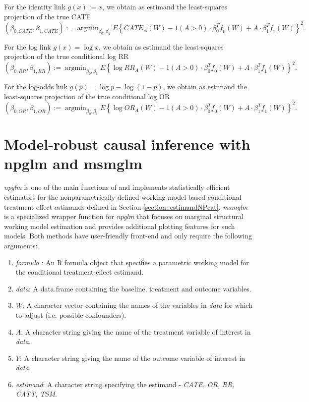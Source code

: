 \documentclass[
]{jss}
\DeclareMathOperator{\argmin}{argmin}
\begin{document}
For the identity link \(g(x) := x\), we obtain as estimand the
least-squares projection of the true CATE
\[ (\beta_{0,CATE}, \beta_{1,CATE}) := \argmin_{\beta_0, \beta_1} E \left\{ CATE_A(W)  - 1(A>0)\cdot \beta_0^T \underline{f}_0(W) +  A \cdot \beta_1^T \underline{f}_1(W)\right\}^2.\]

For the log link \(g(x) = \log x\), we obtain as estimand the
least-squares projection of the true conditional log RR
\[ (\beta_{0,RR}, \beta_{1,RR}) :=  \argmin_{\beta_0, \beta_1} E \left\{ \log RR_{A}(W)  - 1(A>0)\cdot \beta_0^T \underline{f}_0(W) +  A \cdot \beta_1^T \underline{f}_1(W)\right\}^2.\]

For the log-odds link \(g(p) = \log p - \log (1-p)\), we obtain as
estimand the least-squares projection of the true conditional log OR
\[ (\beta_{0,OR}, \beta_{1,OR}) :=  \argmin_{\beta_0, \beta_1} E \left\{ \log OR_{A}(W)  - 1(A>0)\cdot \beta_0^T \underline{f}_0(W) +  A \cdot \beta_1^T \underline{f}_1(W)\right\}^2.\]

\section{Model-robust causal inference with npglm and msmglm}

\textit{npglm} is one of the main functions of  and
implements statistically efficient estimators for the
nonparametrically-defined working-model-based conditional treatment
effect estimands defined in Section \ref{section::estimandNPcat}.
\textit{msmglm} is a specialized wrapper function for \textit{npglm}
that focuses on marginal structural working model estimation and
provides additional plotting features for such models. Both methods have
user-friendly front-end and only require the following arguments:

\begin{enumerate}
\item \textit{formula} : An R formula object that specifies a parametric working model for the conditional treatment-effect estimand.
\item \textit{data}: A data.frame containing the baseline, treatment and outcome variables.
\item $W$: A character vector containing the names of the variables in \textit{data} for which to adjust (i.e. possible confounders).
\item $A$:  A character string giving the name of the treatment variable of interest in \textit{data}.
\item $Y$: A character string giving the name of the outcome variable of interest in \textit{data}.
\item \textit{estimand}: A character string specifying the estimand - \textit{CATE, OR, RR, CATT, TSM}.
\end{enumerate}
\end{document}
